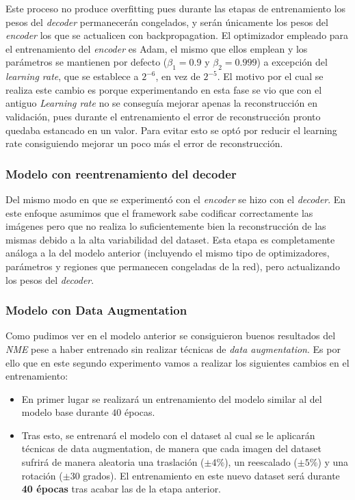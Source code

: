             \noindent Este proceso no produce overfitting pues durante las etapas de entrenamiento los pesos del \textit{decoder} permanecerán congelados, y serán únicamente los pesos del \textit{encoder} los que se actualicen con backpropagation. El optimizador empleado para el entrenamiento del \textit{encoder} es Adam, el mismo que ellos emplean y los parámetros se mantienen por defecto ($\beta_1=0.9$ y $\beta_2=0.999$) a excepción del \textit{learning rate}, que se establece a $2^{-6}$, en vez de $2^{-5}$. El motivo por el cual se realiza este cambio es porque experimentando en esta fase se vio que con el antiguo \textit{Learning rate} no se conseguía mejorar apenas la reconstrucción en validación, pues durante el entrenamiento el error de reconstrucción pronto quedaba estancado en un valor. Para evitar esto se optó por reducir el learning rate consiguiendo mejorar un poco más el error de reconstrucción.

        \subsubsection{Modelo con reentrenamiento del decoder}
            \noindent Del mismo modo en que se experimentó con el \textit{encoder} se hizo con el \textit{decoder}. En este enfoque asumimos que el framework sabe codificar correctamente las imágenes pero que no realiza lo suficientemente bien la reconstrucción de las mismas debido a la alta variabilidad del dataset. Esta etapa es completamente análoga a la del modelo anterior (incluyendo el mismo tipo de optimizadores, parámetros y regiones que permanecen congeladas de la red), pero actualizando los pesos del \textit{decoder}.
            
        \subsubsection{Modelo con Data Augmentation}
            \noindent Como pudimos ver en el modelo anterior se consiguieron buenos resultados del \textit{NME} pese a haber entrenado sin realizar técnicas de \textit{data augmentation}. Es por ello que en este segundo experimento vamos a realizar los siguientes cambios en el entrenamiento: 
            
            \begin{itemize}
                \item En primer lugar se realizará un entrenamiento del modelo similar al del modelo base durante $40$ épocas.
                \item Tras esto, se entrenará el modelo con el dataset al cual se le aplicarán técnicas de data augmentation, de manera que cada imagen del dataset sufrirá de manera aleatoria una traslación ($\pm 4\%$), un reescalado ($\pm 5\%$) y una rotación ($\pm 30$ grados). El entrenamiento en este nuevo dataset será durante \textbf{40 épocas} tras acabar las de la etapa anterior. 
            \end{itemize}


